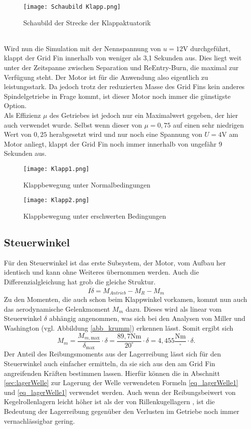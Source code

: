 \begin{figure}[h] 
	\centering
	\texttt{[image: Schaubild Klapp.png]}
	\caption{Schaubild der Strecke der Klappaktuatorik}
\end{figure}\\
Wird nun die Simulation mit der Nennspannung von $u = 12$V durchgeführt, klappt der Grid Fin innerhalb von weniger als 3,1 Sekunden aus. Dies liegt weit unter der Zeitspanne zwischen Separation und ReEntry-Burn, die maximal zur Verfügung steht. Der Motor ist für die Anwendung also eigentlich zu leistungsstark. Da jedoch trotz der reduzierten Masse des Grid Fins kein anderes Spindelgetriebe in Frage kommt, ist dieser Motor noch immer die günstigste Option.
\\
Als Effizienz $\mu$ des Getriebes ist jedoch nur ein Maximalwert gegeben, der hier auch verwendet wurde. Selbst wenn dieser von $\mu = 0,75$ auf einen sehr niedrigen Wert von $0,25$ herabgesetzt wird und nur noch eine Spannung von $U = 4$V am Motor anliegt, klappt der Grid Fin noch immer innerhalb von ungefähr 9 Sekunden aus.
\begin{figure}[h] 
	\centering
	\texttt{[image: Klapp1.png]}
	\caption{Klappbewegung unter Normalbedingungen}
\end{figure}
\begin{figure}[h] 
	\centering
	\texttt{[image: Klapp2.png]}
	\caption{Klappbewegung unter erschwerten Bedingungen}
\end{figure}
\subsection{Steuerwinkel}
Für den Steuerwinkel ist das erste Subsystem, der Motor, vom Aufbau her identisch und kann ohne Weiteres übernommen werden. Auch die Differenzialgleichung hat grob die gleiche Struktur.
\begin{equation}
	I\ddot{\delta} = M_{Antrieb} - M_{R} - M_{m}
\end{equation}
Zu den Momenten, die auch schon beim Klappwinkel vorkamen, kommt nun auch das aerodynamische Gelenkmoment $M_m$ dazu. Dieses wird als linear vom Steuerwinkel $\delta$ abhängig angenommen, was sich bei den Analysen von Miller und Washington \cite{synopsis} (vgl. Abbildung \ref{abb_krumm}) erkennen lässt. Somit ergibt sich
\begin{equation}
	M_{m} = \frac{M_{m, \mathrm{max}}}{\delta_\mathrm{max}} \cdot \delta =\frac{89,7\mathrm{Nm}}{20^\circ} \cdot \delta = 4,455\frac{\mathrm{Nm}}{^\circ}\cdot \delta.
\end{equation}
Der Anteil des Reibungsmoments aus der Lagerreibung lässt sich für den Steuerwinkel auch einfacher ermitteln, da sie sich aus den am Grid Fin angreifenden Kräften bestimmen lassen. Hierfür können die in Abschnitt \ref{sec:lagerWelle} zur Lagerung der Welle verwendeten Formeln \ref{eq_lagerWelle1} und \ref{eq_lagerWelle1} verwendet werden. Auch wenn der Reibungsbeiwert von Kegelrollenlagern leicht höher ist als der von Rillenkugellagern \cite{lagerreibung}, ist die Bedeutung der Lagerreibung gegenüber den Verlusten im Getriebe noch immer vernachlässigbar gering.

